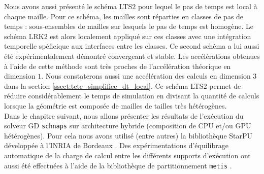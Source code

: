 Nous avons aussi présenté le schéma LTS$2$ pour lequel le pas de
temps est local à chaque maille.
Pour ce schéma, les mailles sont réparties en classes de pas de temps :
sous-ensembles de mailles sur lesquels le pas de temps est homogène.
Le schéma LRK$2$ est alors localement appliqué sur ces classes
avec une intégration temporelle spéficique aux interfaces entre les classes.
Ce second schéma a lui aussi été expérimentalement démontré convergeant et stable.
Les accélérations obtenues à l'aide de cette méthode sont
très proches de l'accélération théorique en dimension $1$.
Nous constaterons aussi une accélération des calculs
en dimension $3$ dans la section \ref{ssect:tete_simplifiee_dt_local}.
Ce schéma LTS$2$ permet de réduire
considérablement le temps de simulation en divisant la quantité
de calculs lorsque la géométrie est composée de mailles de tailles très hétérogènes.
\\


Dans le chapitre suivant, nous allons présenter les résultats
de l'exécution du solveur GD \texttt{schnaps} sur architecture hybride
(composition de CPU et/ou GPU hétérogènes).
Pour cela nous avons utilisé (entre autres) la bibliothèque StarPU
développée à l'INRIA de Bordeaux
\cite{augonnet2011starpu,augonnet2012starpu}.
Des expérimentations d'équilibrage automatique de la charge
de calcul entre les différents supports d'exécution
ont aussi été effectuées à l'aide de la bibliothèque de
partitionnement \texttt{metis} \cite{Karypis:1998:FHQ:305219.305248}.


